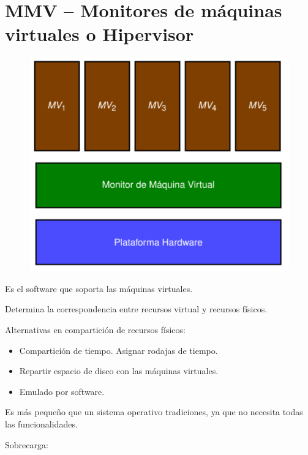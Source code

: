 \documentclass[12pt, twoside, openright]{report} %
\begin{document}
\section{MMV -- Monitores de máquinas virtuales o Hipervisor}
\begin{figure}[H]
	{\includegraphics[scale=.6]{Untitled 32.png}}
\end{figure}
  

    Es el software que soporta las máquinas virtuales.

    
  Determina la correspondencia entre recursos virtual y recursos
  físicos.

 
  
    Alternativas en compartición de recursos físicos:

    \begin{itemize}
    
    \item
      Compartición de tiempo. Asignar rodajas de tiempo.
    \item
      Repartir espacio de disco con las máquinas virtuales.
    \item
      Emulado por software.
    \end{itemize}

    Es más pequeño que un sistema operativo tradiciones, ya que no
    necesita todas las funcionalidades.

    Sobrecarga:
\end{document}
